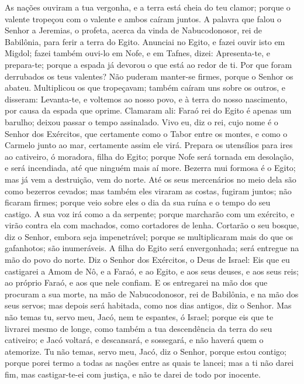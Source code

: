 As nações ouviram a tua vergonha, e a terra está cheia do teu
clamor; porque o valente tropeçou com o valente e ambos caíram
juntos. A palavra que falou o Senhor a Jeremias, o profeta,
acerca da vinda de Nabucodonosor, rei de Babilônia, para ferir a
terra do Egito. Anunciai no Egito, e fazei ouvir isto em
Migdol; fazei também ouvi-lo em Nofe, e em Tafnes, dizei:
Apresenta-te, e prepara-te; porque a espada já devorou o que está ao
redor de ti. Por que foram derrubados os teus valentes? Não
puderam manter-se firmes, porque o Senhor os abateu.
Multiplicou os que tropeçavam; também caíram uns sobre os
outros, e disseram: Levanta-te, e voltemos ao nosso povo, e à terra
do nosso nascimento, por causa da espada que oprime. Clamaram
ali: Faraó rei do Egito é apenas um barulho; deixou passar o tempo
assinalado. Vivo eu, diz o rei, cujo nome é o Senhor dos
Exércitos, que certamente como o Tabor entre os montes, e como o
Carmelo junto ao mar, certamente assim ele virá. Prepara os
utensílios para ires ao cativeiro, ó moradora, filha do Egito;
porque Nofe será tornada em desolação, e será incendiada, até que
ninguém mais aí more. Bezerra mui formosa é o Egito; mas já
vem a destruição, vem do norte. Até os seus mercenários no
meio dela são como bezerros cevados; mas também eles viraram as
costas, fugiram juntos; não ficaram firmes; porque veio sobre eles o
dia da sua ruína e o tempo do seu castigo. A sua voz irá como
a da serpente; porque marcharão com um exército, e virão contra ela
com machados, como cortadores de lenha. Cortarão o seu
bosque, diz o Senhor, embora seja impenetrável; porque se
multiplicaram mais do que os gafanhotos; são inumeráveis. A
filha do Egito será envergonhada; será entregue na mão do povo do
norte. Diz o Senhor dos Exércitos, o Deus de Israel: Eis que
eu castigarei a Amom de Nô, e a Faraó, e ao Egito, e aos seus
deuses, e aos seus reis; ao próprio Faraó, e aos que nele confiam.
E os entregarei na mão dos que procuram a sua morte, na mão
de Nabucodonosor, rei de Babilônia, e na mão dos seus servos; mas
depois será habitada, como nos dias antigos, diz o Senhor.
Mas não temas tu, servo meu, Jacó, nem te espantes, ó Israel;
porque eis que te livrarei mesmo de longe, como também a tua
descendência da terra do seu cativeiro; e Jacó voltará, e
descansará, e sossegará, e não haverá quem o atemorize. Tu
não temas, servo meu, Jacó, diz o Senhor, porque estou contigo;
porque porei termo a todas as nações entre as quais te lancei; mas a
ti não darei fim, mas castigar-te-ei com justiça, e não te darei de
todo por inocente.


